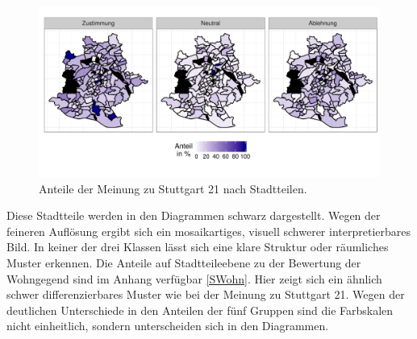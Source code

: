 \documentclass{Vorlage}
\begin{document}
\begin{figure}[h]
 \begin{center}
 \includegraphics[scale=0.8]{Pictures/SStuttgart3}
 \caption{Anteile der Meinung zu Stuttgart 21 nach Stadtteilen.}
 \label{SStuttgart21}
 \end{center}
\end{figure}

Diese Stadtteile werden in den Diagrammen schwarz dargestellt. Wegen der feineren Auflösung ergibt sich ein mosaikartiges, visuell schwerer interpretierbares Bild. In keiner der drei Klassen lässt sich eine klare Struktur oder räumliches Muster erkennen. Die Anteile auf Stadtteileebene zu der Bewertung der Wohngegend sind im Anhang verfügbar \ref{SWohn}. Hier zeigt sich ein ähnlich schwer differenzierbares Muster wie bei der Meinung zu Stuttgart 21. Wegen der deutlichen Unterschiede in den Anteilen der fünf Gruppen sind die Farbskalen nicht einheitlich, sondern unterscheiden sich in den Diagrammen.\\
\end{document}
